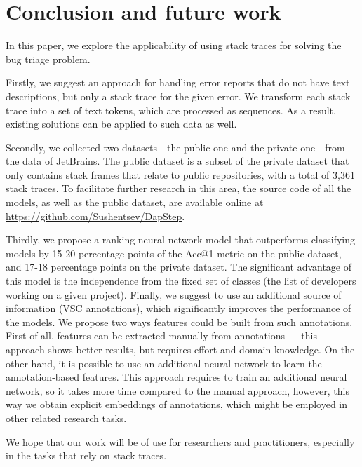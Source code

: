 \section{Conclusion and future work}\label{sec:conclusion}

In this paper, we explore the applicability of using stack traces for solving the bug triage problem.

Firstly, we suggest an approach for handling error reports that do not have text descriptions, but only a stack trace for the given error. We transform each stack trace into a set of text tokens, which are processed as sequences. As a result, existing solutions can be applied to such data as well.

Secondly, we collected two datasets---the public one and the private one---from the data of JetBrains. The public dataset is a subset of the private dataset that only contains stack frames that relate to public repositories, with a total of 3,361 stack traces. To facilitate further research in this area, the source code of all the models, as well as the public dataset, are available online at \url{https://github.com/Sushentsev/DapStep}.

Thirdly, we propose a ranking neural network model that outperforms classifying models by 15-20 percentage points of the Acc@1 metric on the public dataset, and 17-18 percentage points on the private dataset. The significant advantage of this model is the independence from the fixed set of classes (the list of developers working on a given project). Finally, we suggest to use an additional source of information (VSC annotations), which significantly improves the performance of the models. We propose two ways features could be built from such annotations. First of all, features can be extracted manually from annotations --- this approach shows better results, but requires effort and domain knowledge. On the other hand, it is possible to use an additional neural network to learn the annotation-based features. This approach requires to train an additional neural network, so it takes more time compared to the manual approach, however, this way we obtain explicit embeddings of annotations, which might be employed in other related research tasks.

We hope that our work will be of use for researchers and practitioners, especially in the tasks that rely on stack traces.

